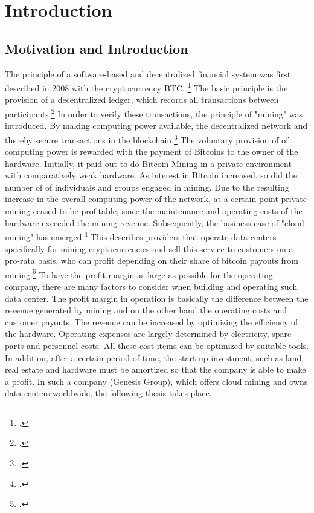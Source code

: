 \section{Introduction} \label{toc:einleitung}

\subsection{Motivation and Introduction} \label{toc:motivation}

The principle of a software-based and decentralized financial system was first described in 2008 with the cryptocurrency \ac{BTC}.
\footcite[Cf.][]{nakamoto2008bitcoin} The basic principle is the provision of a decentralized ledger,
which records all transactions between participants.\footcite[Cf.][]{badertscher2017bitcoin} In order to verify these transactions,
the principle of "mining" was introduced. By making computing power available, the decentralized 
network and thereby secure transactions in the blockchain.\footcite[Cf.][]{kroll2013economics} The voluntary provision of
of computing power is rewarded with the payment of Bitcoins to the owner of the hardware. Initially, it paid out to do Bitcoin
Mining in a private environment with comparatively weak hardware. As interest in Bitcoin increased, so did the number of
of individuals and groups engaged in mining. Due to the resulting increase in the overall computing power of the network, at a certain point
private mining ceased to be profitable, since the maintenance and operating costs of the hardware
exceeded the mining revenue. Subsequently, the business case of "cloud mining" has emerged.\footcite[Cf.][]{taylor2017evolution} This describes
providers that operate data centers specifically for mining cryptocurrencies and sell this service to customers on a pro-rata basis,
who can profit depending on their share of bitcoin payouts from mining.\footcite[Cf.][chap. 3.4.5]{bhaskar2015bitcoin}
To have the profit margin as large as possible for the operating company, there are many factors to consider when building and operating
such data center. The profit margin in operation is basically the difference between the revenue generated by mining
and on the other hand the operating costs and customer payouts. The revenue can be increased by optimizing the efficiency of the hardware.
Operating expenses are largely determined by electricity, spare parts and personnel costs. All these cost items
can be optimized by suitable tools. In addition, after a certain period of time, the start-up investment, such as land, real estate and hardware
must be amortized so that the company is able to make a profit. In such a company (Genesis Group),
which offers cloud mining and owns data centers worldwide, the following thesis takes place. 

